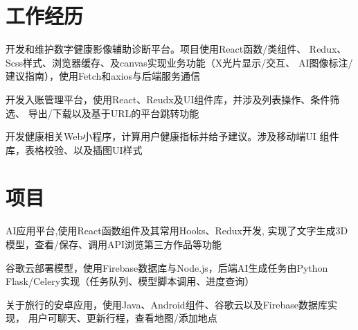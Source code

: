 \documentclass[]{deedy-resume-openfont}
\begin{document}
\begin{minipage}[t]{0.73\textwidth} 


\section{工作经历}
\sectionsep
{}
\vspace{\topsep}
\begin{tightemize}
    \item 开发和维护数字健康影像辅助诊断平台。项目使用React函数/类组件、
    Redux、Scss样式、浏览器缓存、及canvas实现业务功能（X光片显示/交互、
    AI图像标注/建议指南），使用Fetch和axios与后端服务通信
    \item 开发入账管理平台，使用React、Reudx及UI组件库，并涉及列表操作、条件筛选、
    导出/下载以及基于URL的平台跳转功能
    \item 开发健康相关Web小程序，计算用户健康指标并给予建议。涉及移动端UI
    组件库，表格校验、以及插图UI样式
    
\end{tightemize}
\sectionsep


\section{项目}
\sectionsep
{}
\begin{tightemize}
    \item AI应用平台,使用React函数组件及其常用Hooks、Redux开发, 实现了文字生成3D模型，查看/保存、调用API浏览第三方作品等功能
    \item 谷歌云部署模型，使用Firebase数据库与Node.js，后端AI生成任务由Python Flask/Celery实现（任务队列、模型脚本调用、进度查询）

    \end{tightemize}

\sectionsep

\begin{tightemize}
    \item 关于旅行的安卓应用，使用Java、Android组件、谷歌云以及Firebase数据库实现，
    用户可聊天、更新行程，查看地图/添加地点
    \end{tightemize}


\end{minipage}
\end{document}
